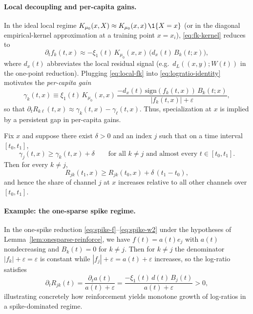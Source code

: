 \paragraph{Local decoupling and per-capita gains.}
In the ideal local regime $K_{\mu_0}(x,X)\approx K_{\mu_0}(x,x)\,\1\{X=x\}$ (or in the diagonal empirical-kernel approximation at a training point $x=x_i$), \eqref{eq:fk-kernel} reduces to
\begin{equation}\label{eq:local-fk}
\partial_t f_k(t,x)\approx -\xi_1(t)\,K_{\mu_0}(x,x)\,\Big(d_x(t)\,B_k(t;x)\Big),
\end{equation}
where $d_x(t)$ abbreviates the local residual signal (e.g.\ $d_L((x,y);W(t))$ in the one-point reduction).
Plugging \eqref{eq:local-fk} into \eqref{eq:logratio-identity} motivates the \emph{per-capita gain}
\[
\gamma_k(t,x)\equiv \xi_1(t)\,K_{\mu_0}(x,x)\,\frac{-d_x(t)\,\mathrm{sign}(f_k(t,x))\,B_k(t;x)}{|f_k(t,x)|+\varepsilon},
\]
so that $\partial_t R_{k\ell}(t,x)\approx \gamma_k(t,x)-\gamma_\ell(t,x)$.
Thus, specialization at $x$ is implied by a persistent gap in per-capita gains.

\begin{lemma}\label{lem:percap-gap}
Fix $x$ and suppose there exist $\delta>0$ and an index $j$ such that on a time interval $[t_0,t_1]$,
\[
\gamma_j(t,x)\ge \gamma_k(t,x)+\delta\qquad\text{for all }k\neq j\text{ and almost every }t\in[t_0,t_1].
\]
Then for every $k\neq j$,
\[
R_{jk}(t_1,x)\ge R_{jk}(t_0,x)+\delta\,(t_1-t_0),
\]
and hence the share of channel $j$ at $x$ increases relative to all other channels over $[t_0,t_1]$.
\end{lemma}

\paragraph{Example: the one-sparse spike regime.}
In the one-spike reduction \eqref{eq:spike-f}--\eqref{eq:spike-w2} under the hypotheses of Lemma~\ref{lem:onesparse-reinforce},
we have $f(t)=a(t)e_j$ with $a(t)$ nondecreasing and $B_k(t)=0$ for $k\neq j$.
Then for $k\neq j$ the denominator $|f_k|+\varepsilon=\varepsilon$ is constant while $|f_j|+\varepsilon=a(t)+\varepsilon$ increases, so the log-ratio satisfies
\[
\partial_t R_{jk}(t)=\frac{\partial_t a(t)}{a(t)+\varepsilon}=\frac{-\xi_1(t)\,d(t)\,B_j(t)}{a(t)+\varepsilon}>0,
\]
illustrating concretely how reinforcement yields monotone growth of log-ratios in a spike-dominated regime.

